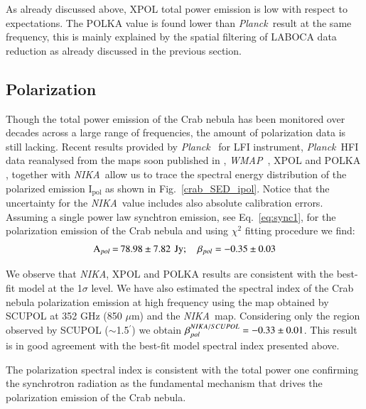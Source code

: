 \documentclass[twocolumn,traditabstract]{aa}
\def\NIKA{\textit{NIKA}}
\def\Planck{\textit{Planck}}
\def\WMAP{\textit{WMAP}}
\begin{document}
As already discussed above, XPOL total power emission is low with respect to expectations.
The POLKA value is found lower than \Planck\ result at the same frequency, this is mainly explained by the spatial filtering of LABOCA data reduction as already discussed in the previous section.
  


\subsection{Polarization}
Though the total power emission of the Crab nebula has been monitored over decades across a large range of frequencies, the amount of polarization data is still lacking.
Recent results provided by
\Planck\ \citep{2015arXiv150702058P} for LFI instrument, \Planck\ HFI data reanalysed from the maps soon published in \cite{planck2018}, \WMAP\ \citep{2011ApJS..192...19W},
XPOL \citep{aumont2010} and POLKA \citep{2014PASP..126.1027W}, together with \NIKA\ allow us to trace the spectral energy distribution of the polarized emission I$_{\textrm{pol}}$ as shown in Fig.~\ref{crab_SED_ipol}.  
Notice that the uncertainty for the \NIKA\ value includes also absolute calibration errors.  
Assuming a single power law synchtron emission, see Eq.~\ref{eq:sync1}, for the polarization emission of the Crab nebula and using $\chi^2$ fitting procedure we find:
$$
\setlength\arraycolsep{0.1em}
 \begin{array}{rclcl}
  \textrm{A$_{pol}$}&=& 78.98\pm7.82 & & \textrm{Jy}; \quad \textrm{$\beta_{pol}$} = - 0.35\pm0.03\\
 \end{array}
 $$
 
We observe that \NIKA, XPOL and POLKA results are consistent with the best-fit model at the 1$\sigma$ level.
We have also estimated the spectral index of the Crab nebula polarization
emission at high frequency using the map obtained by SCUPOL \citep{scubapol} at 352 GHz (850
$\mu$m) and the \NIKA\ map. Considering only the region observed by SCUPOL ($\sim$1.5$^{\prime}$) we
obtain $\beta_{pol}^{\small NIKA/SCUPOL} = -0.33 \pm 0.01$.
This result is in good agreement with the best-fit model spectral index presented above.

The polarization spectral index is consistent with the total power one confirming the synchrotron radiation as the fundamental mechanism that drives the polarization emission of the Crab nebula.
\end{document}
